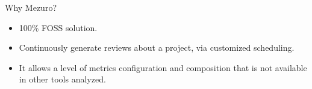 \begin{block}{Why Mezuro?}
    \begin{itemize}
        \item 100\% FOSS solution.

        \item Continuously generate reviews about a project, via customized
            scheduling.

        \item It allows a level of metrics configuration and composition that
            is not available in other tools analyzed.
    \end{itemize}
\end{block}

